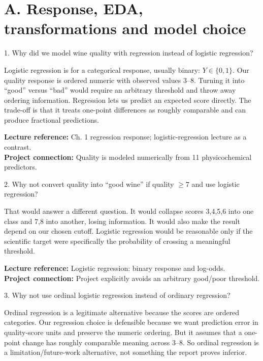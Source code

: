 \documentclass[10.5pt,a4paper]{article}
\newcommand{\chapref}[1]{\textbf{Lecture reference:} #1}
\newcommand{\projectref}[1]{\textbf{Project connection:} #1}
\begin{document}
\section*{A. Response, EDA, transformations and model choice}
\begin{qbox}{1. Why did we model wine quality with regression instead of logistic regression?}
\end{qbox}
\begin{answerbox}Logistic regression is for a categorical response, usually binary: \(Y\in\{0,1\}\). Our quality response is ordered numeric with observed values 3--8. Turning it into ``good'' versus ``bad'' would require an arbitrary threshold and throw away ordering information. Regression lets us predict an expected score directly. The trade-off is that it treats one-point differences as roughly comparable and can produce fractional predictions.\end{answerbox}
\begin{refbox}\chapref{Ch. 1 regression response; logistic-regression lecture as a contrast.}\\\projectref{Quality is modeled numerically from 11 physicochemical predictors.}\end{refbox}
\begin{qbox}{2. Why not convert quality into ``good wine'' if quality $\ge 7$ and use logistic regression?}
\end{qbox}
\begin{answerbox}That would answer a different question. It would collapse scores 3,4,5,6 into one class and 7,8 into another, losing information. It would also make the result depend on our chosen cutoff. Logistic regression would be reasonable only if the scientific target were specifically the probability of crossing a meaningful threshold.\end{answerbox}
\begin{refbox}\chapref{Logistic regression: binary response and log-odds.}\\\projectref{Project explicitly avoids an arbitrary good/poor threshold.}\end{refbox}
\begin{qbox}{3. Why not use ordinal logistic regression instead of ordinary regression?}
\end{qbox}
\begin{answerbox}Ordinal regression is a legitimate alternative because the scores are ordered categories. Our regression choice is defensible because we want prediction error in quality-score units and preserve the numeric ordering. But it assumes that a one-point change has roughly comparable meaning across 3--8. So ordinal regression is a limitation/future-work alternative, not something the report proves inferior.\end{answerbox}
\end{document}
